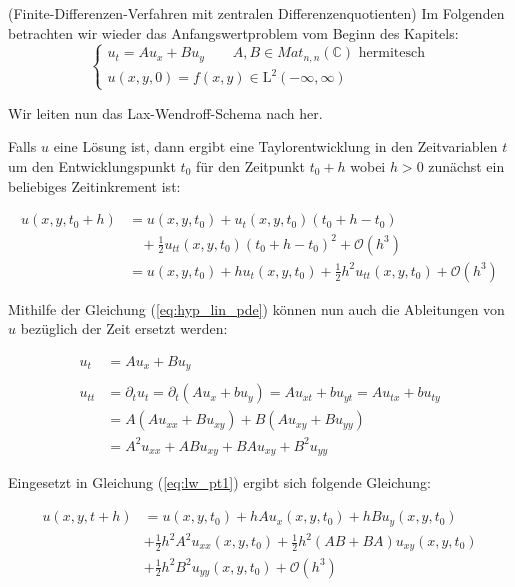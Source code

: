 \begin{ex}(Finite-Differenzen-Verfahren mit zentralen Differenzenquotienten)
    Im Folgenden betrachten wir wieder das Anfangswertproblem vom Beginn des Kapitels:
    \begin{equation} \label{eq:hyp_lin_pde}
        \begin{cases}
            u_t = Au_x+Bu_y \qquad A,B \in Mat_{n,n}(\mathbb{C}) \text{ hermitesch} \\
            u(x,y,0) = f(x,y) \in\operatorname{L^2}(-\infty, \infty)
        \end{cases}
    \end{equation}

    Wir leiten nun das Lax-Wendroff-Schema nach \parencite[][S. 277]{goldberg1982numerical} her.

    Falls $u$ eine Lösung ist, dann ergibt eine Taylorentwicklung in den Zeitvariablen $t$ um den Entwicklungspunkt $t_0$ für den Zeitpunkt $t_0+h$ wobei $h>0$ zunächst ein beliebiges Zeitinkrement ist:

    \begin{align} \label{eq:lw_pt1}
        u(x,y,t_0+h) & = u(x,y,t_0) + u_t(x,y,t_0) (t_0+h-t_0) \nonumber \\ 
        & \phantom{m} + \frac{1}{2} u_{tt}(x,y,t_0) (t_0+h-t_0)^2 + \mathcal{O}(h^3)  \nonumber \\
        & = u(x,y,t_0) + hu_t(x,y,t_0)+ \frac{1}{2} h^2 u_{tt}(x,y,t_0) + \mathcal{O}(h^3)
    \end{align}

    Mithilfe der Gleichung (\ref{eq:hyp_lin_pde}) können nun auch die Ableitungen von $u$ bezüglich der Zeit ersetzt werden:

    \begin{align}
        u_t & = Au_x+Bu_y \\ \nonumber \\
        u_{tt} & = \partial_t u_t = \partial_t (Au_x+bu_y) = Au_{xt}+bu_{yt} = Au_{tx}+bu_{ty} \nonumber \\
        & = A(Au_{xx} + Bu_{xy}) + B(Au_{xy} + Bu_{yy}) \nonumber \\ 
        & = A^2u_{xx} + ABu_{xy} + BAu_{xy} + B^2u_{yy}
    \end{align}


    Eingesetzt in Gleichung (\ref{eq:lw_pt1}) ergibt sich folgende Gleichung:

    \begin{align}
        u(x,y,t+h) & = u(x,y,t_0) + hAu_x(x,y,t_0)+hBu_y(x,y,t_0) \nonumber \\ 
        & + \frac{1}{2} h^2 A^2u_{xx}(x,y,t_0) + \frac{1}{2} h^2 (AB+BA)u_{xy}(x,y,t_0) \nonumber \\ 
        & + \frac{1}{2} h^2 B^2u_{yy}(x,y,t_0) + \mathcal{O}(h^3)
    \end{align}


\end{ex}
